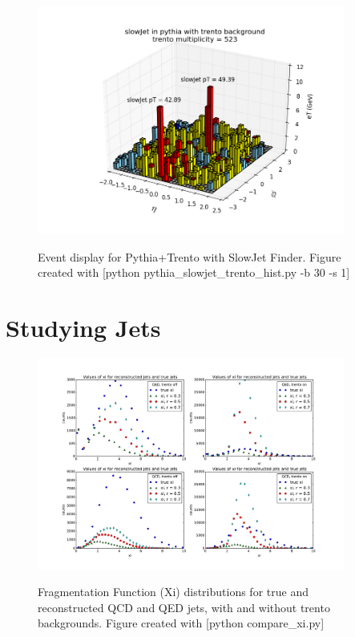\documentclass[11pt]{article}
\begin{document}
\begin{figure}[h]
\begin{center}
\includegraphics[width=0.9\textwidth]{pythia_slowjet_trento_hist2.png}
\label{fig_label}
\caption{Event display for Pythia+Trento with SlowJet Finder.  Figure created with [python pythia\_slowjet\_trento\_hist.py -b 30 -s 1]}
\end{center}
\end{figure}

\section{Studying Jets}
%
%

\begin{figure}[h]
\begin{center}
\includegraphics[width=0.9\textwidth]{compare_xi.pdf}
\label{fig_label}
\caption{Fragmentation Function (Xi) distributions for true and reconstructed QCD and QED jets, with and without trento backgrounds.  Figure created with [python compare\_xi.py]}
\end{center}
\end{figure}

%
%
\end{document}
